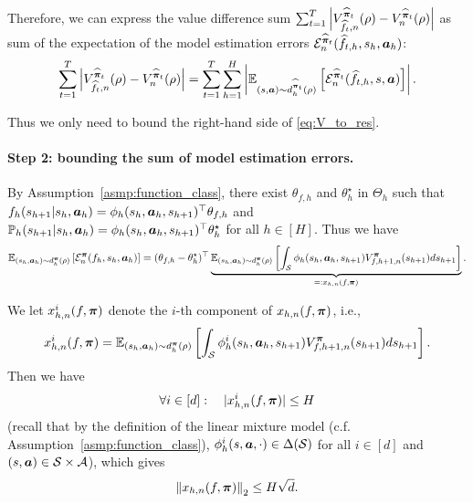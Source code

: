 Therefore, we can express the value difference sum $\sum_{t=1}^T \left|V_{\widehat{f}_{t},n}^{\widehat{{\bm{\pi}}}_{t}}(\rho)-V_{n}^{\widehat{{\bm{\pi}}}_{t}}(\rho)\right|$ as sum of the expectation of the model estimation errors ${\mathcal{E}}_n^{\widehat{{\bm{\pi}}}_{t}}(\widehat{f}_{t,h},s_h,{\bm{a}}_h)$:
\begin{align}\label{eq:V_to_res}
    \sum_{t=1}^T \left|V_{\widehat{f}_{t},n}^{\widehat{{\bm{\pi}}}_{t}}(\rho)-V_{n}^{\widehat{{\bm{\pi}}}_{t}}(\rho)\right|= \sum_{t=1}^T\sum_{h=1}^H \left| \mathbb{E}_{(s,{\bm{a}})\sim d_h^{\widehat{{\bm{\pi}}}_{t}}(\rho)}\left[{\mathcal{E}}_n^{\widehat{{\bm{\pi}}}_{t}}(\widehat{f}_{t,h},s,{\bm{a}})\right]\right|.
\end{align}

Thus we only need to bound the right-hand side of \eqref{eq:V_to_res}.

\paragraph{Step 2: bounding the sum of model estimation errors.}

    By Assumption~\ref{asmp:function_class}, there exist $\theta_{f,h}$ and $\theta_h^\star$ in $\Theta_h$ such that $f_h(s_{h+1}|s_h,{\bm{a}}_h)=\phi_h(s_h,{\bm{a}}_h,s_{h+1})^\top\theta_{f,h}$ and ${\mathbb P}_h(s_{h+1}|s_h,{\bm{a}}_h)=\phi_h(s_h,{\bm{a}}_h,s_{h+1})^\top\theta_h^\star$ for all $h\in[H]$.
    Thus we have
    \begin{align}
        \mathbb{E}_{(s_h,{\bm{a}}_h)\sim d_h^{\bm{\pi}}(\rho)}\left[{\mathcal{E}}_n^{\bm{\pi}}(f_h,s_h,{\bm{a}}_h)\right] = (\theta_{f,h}-\theta_h^\star)^\top\underbrace{\mathbb{E}_{(s_h,{\bm{a}}_h)\sim d_h^{\bm{\pi}}(\rho)}\left[\int_{{\mathcal{S}}}\phi_h(s_h,{\bm{a}}_h,s_{h+1})V_{f,h+1,n}^{\bm{\pi}}(s_{h+1})ds_{h+1}\right]}_{=: x_{h,n}(f,{\bm{\pi}})}.
    \end{align}
    
    We let $x_{h,n}^i(f,{\bm{\pi}})$ denote the $i$-th component of $x_{h,n}(f,{\bm{\pi}})$, i.e., $$x_{h,n}^i(f,{\bm{\pi}})=\mathbb{E}_{(s_h,{\bm{a}}_h)\sim d_h^{\bm{\pi}}(\rho)}\left[\int_{{\mathcal{S}}}\phi_h^i(s_h,{\bm{a}}_h,s_{h+1})V_{f,h+1,n}^{\bm{\pi}}(s_{h+1})ds_{h+1}\right].$$
    Then we have
    \begin{align}\label{eq:x_{h,n}_i_bound}
        \forall i\in[d]:\quad |x_{h,n}^i(f,\vpi)|\leq H
    \end{align}
    (recall that by the definition of the linear mixture model (c.f. Assumption~\ref{asmp:function_class}), $\phi_h^i(s,{\bm{a}},\cdot)\in\Delta({\mathcal{S}})$ for all $i\in[d]$ and $(s,{\bm{a}})\in{\mathcal{S}}\times{\mathcal{A}}$), which gives
    \begin{align}\label{eq:x_{h,n}_bound}
        \norm{x_{h,n}(f,\vpi)}_2\leq H\sqrt{d}.
    \end{align}

